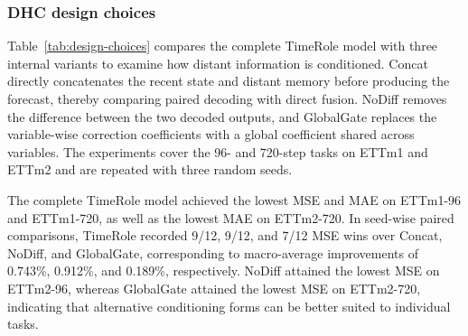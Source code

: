 \subsubsection{DHC design choices}

Table~\ref{tab:design-choices} compares the complete TimeRole model with three internal variants to examine how distant information is conditioned. Concat directly concatenates the recent state and distant memory before producing the forecast, thereby comparing paired decoding with direct fusion. NoDiff removes the difference between the two decoded outputs, and GlobalGate replaces the variable-wise correction coefficients with a global coefficient shared across variables. The experiments cover the 96- and 720-step tasks on ETTm1 and ETTm2 and are repeated with three random seeds.

The complete TimeRole model achieved the lowest MSE and MAE on ETTm1-96 and ETTm1-720, as well as the lowest MAE on ETTm2-720. In seed-wise paired comparisons, TimeRole recorded 9/12, 9/12, and 7/12 MSE wins over Concat, NoDiff, and GlobalGate, corresponding to macro-average improvements of 0.743\%, 0.912\%, and 0.189\%, respectively. NoDiff attained the lowest MSE on ETTm2-96, whereas GlobalGate attained the lowest MSE on ETTm2-720, indicating that alternative conditioning forms can be better suited to individual tasks.

